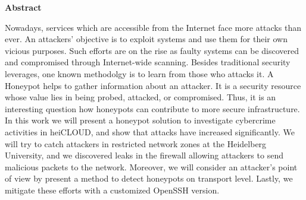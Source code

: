 \thispagestyle{empty}
\begin{center}
    \begin{minipage}[c][0.48\textheight][b]{0.9\textwidth}
        \small
        \begin{center}
            \textbf{Abstract}
        \end{center}\par
        \vspace{\baselineskip}
        Nowadays, services which are accessible from the Internet face more attacks than ever.
        An attackers' objective is to exploit systems and use them for their own vicious purposes.
        Such efforts are on the rise as faulty systems can be discovered and compromised through Internet-wide scanning.
        Besides traditional security leverages, one known methodolgy is to learn from those who attacks it.
        A Honeypot helps to gather information about an attacker.
        It is a security resource whose value lies in being probed, attacked, or compromised.
        Thus, it is an interesting question how honeypots can contribute to more secure infrastructure.
        In this work we will present a honeypot solution to investigate cybercrime activities in heiCLOUD, and show that attacks have increased significantly.
        We will try to catch attackers in restricted network zones at the Heidelberg University, and we discovered leaks in the firewall allowing attackers to send malicious packets to the network.
        Moreover, we will consider an attacker's point of view by present a method to detect honeypots on transport level.
        Lastly, we mitigate these efforts with a customized OpenSSH version.
    \end{minipage}\par
    \vfill
\end{center}